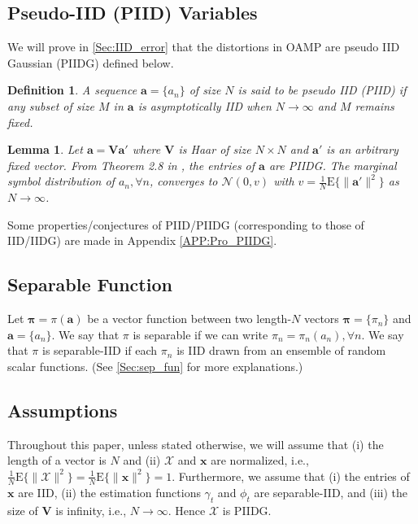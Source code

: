 \documentclass[journal]{IEEEtran}
\newcommand{\mr}{\mathrm}
\renewcommand{\bf}{\bm}
\renewcommand{\cal}{\mathcal}
\newtheorem{definition}[theorem]{Definition}
\newtheorem{lemma}[theorem]{Lemma}
\begin{document}
\subsection{Pseudo-IID (PIID) Variables}\label{Sec:PIIDV}
We will prove in \ref{Sec:IID_error} that the distortions in OAMP are pseudo IID Gaussian (PIIDG) defined below. 
\begin{definition}
  A sequence $\bf{a}=\{a_n\}$ of size $N$ is said to be pseudo IID (PIID) if any subset of size $M$ in $\bf{a}$ is asymptotically IID when $N\to\infty$ and $M$ remains fixed. 
\end{definition} 
 
\begin{lemma}\label{Lem:PIIDG}
Let $\bf{a} = \bf{Va}'$ where $\bf{V}$ is Haar of size $N\times N$ and $\bf{a}'$ is an arbitrary fixed vector. From Theorem 2.8 in \cite{Meckes2014}, the entries of $\bf{a}$ are PIIDG. The marginal symbol distribution of $a_n, \forall n$, converges to ${\cal{N}}(0, v)$  with $v\!=\!\tfrac{1}{N}\mr{E}\{\|\bf{a}'\|^2\}$ as $N\!\to \!\infty$. 
\end{lemma}   


Some properties/conjectures of PIID/PIIDG (corresponding to those of IID/IIDG) are made in Appendix \ref{APP:Pro_PIIDG}.

\subsection{Separable Function}
Let $\bf{\pi}=\pi(\bf{a})$ be a vector function between two length-$N$ vectors $\bf{\pi}=\{\pi_n\}$ and $\bf{a}=\{a_n\}$. We say that $\pi$ is separable if we can write $\pi_n=\pi_n(a_n), \forall n$. We say that $\pi$ is separable-IID if each $\pi_n$ is IID drawn from an ensemble of random scalar functions. (See \ref{Sec:sep_fun} for more explanations.) 

\subsection{Assumptions}
Throughout this paper, unless stated otherwise, we will assume that (i) the length of a vector is $N$ and (ii) $\bf{\mathcal{X}}$ and  $\bf{x}$ are normalized, i.e., $\frac{1}{N}\mr{E}\{\|\bf{\mathcal{X}}\|^2\}=\frac{1}{N}\mr{E}\{\|{\bf{x}}\|^2\}=1$. Furthermore, we assume that (i) the entries of $\bf{x}$ are IID, (ii) the estimation functions $\gamma_t$ and $\phi_t$ are separable-IID, and (iii) the size of $\bf{V}$ is infinity, i.e., $N\to\infty$. Hence $\bf{\mathcal{X}}$ is PIIDG. 
 
\end{document}
